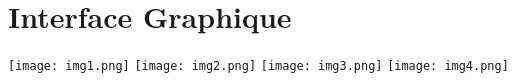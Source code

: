 \section{Interface Graphique}\label{ihm}

\texttt{[image: img1.png]}
\texttt{[image: img2.png]}
\texttt{[image: img3.png]}
\texttt{[image: img4.png]}